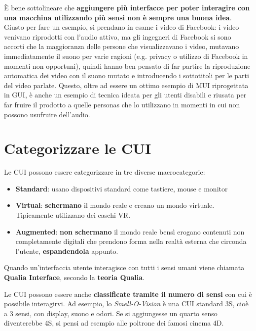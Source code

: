 \documentclass[a4paper,11pt,oneside]{book}
\begin{document}
È bene sottolineare che \textbf{aggiungere più interfacce per poter interagire con una macchina utilizzando più sensi non è sempre una buona idea}. Giusto per fare un esempio, si prendano in esame i video di Facebook: i video venivano riprodotti con l'audio attivo, ma gli ingegneri di Facebook si sono accorti che la maggioranza delle persone che visualizzavano i video, mutavano immediatamente il suono per varie ragioni (e.g. privacy o utilizzo di Facebook in momenti non opportuni), quindi hanno ben pensato di far partire la riproduzione automatica dei video con il suono mutato e introducendo i sottotitoli per le parti del video parlate. Questo, oltre ad essere un ottimo esempio di MUI riprogettata in GUI, è anche un esempio di tecnica ideata per gli utenti disabili e riusata per far fruire il prodotto a quelle personas che lo utilizzano in momenti in cui non possono usufruire dell'audio.

\section{Categorizzare le CUI}
Le CUI possono essere categorizzare in tre diverse macrocategorie:

\begin{itemize}
	\item \textbf{Standard}: usano dispositivi standard come tastiere, mouse e monitor
	\item \textbf{Virtual}: \textbf{schermano} il mondo reale e creano un mondo virtuale. Tipicamente utilizzano dei caschi VR.
	\item \textbf{Augmented}: \textbf{non schermano} il mondo reale bensì erogano contenuti non completamente digitali che prendono forma nella realtà esterna che circonda l'utente, \textbf{espandendola} appunto.
\end{itemize}

Quando un'interfaccia utente interagisce con tutti i sensi umani viene chiamata \textbf{Qualia Interface}, secondo la \textbf{teoria Qualia}.

Le CUI possono essere anche \textbf{classificate tramite il numero di sensi} con cui è possibile interagirvi. Ad esempio, lo \textit{Smell-O-Vision} è una CUI standard 3S, cioè a 3 sensi, con display, suono e odori. Se si aggiungesse un quarto senso diventerebbe 4S, si pensi ad esempio alle poltrone dei famosi cinema 4D.
\end{document}
